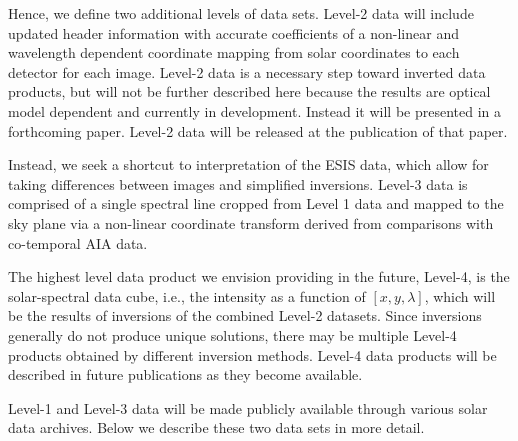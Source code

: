     Hence, we define two additional levels of data sets.  Level-2 data will include updated header information with accurate coefficients of a non-linear and wavelength dependent coordinate mapping from solar coordinates to each detector for each image.   Level-2 data is a necessary step toward inverted data products,  but will not be further described here because the results are optical model dependent and currently in development.   Instead it will be presented in a forthcoming paper.  Level-2 data will be released at the publication of that paper.  

    Instead, we seek a shortcut to interpretation of the ESIS data, which allow for taking differences between images and simplified inversions.
    Level-3 data is comprised of a single spectral line cropped from Level 1 data and mapped to the sky plane via a non-linear coordinate transform derived from comparisons with co-temporal AIA data.
    
    The highest level data product we envision providing in the future, Level-4, is the solar-spectral data cube, i.e., the intensity as a function of $[x, y , \lambda]$, which will be the results of inversions of the combined Level-2 datasets.     Since inversions generally do not produce unique solutions, there may be multiple Level-4 products obtained by different inversion methods.  Level-4 data products will be described in future publications as they become available.   
    
    Level-1 and Level-3 data will be made publicly available through various solar data archives. Below we describe these two data sets in more detail. 
    
    
       
    
	     

